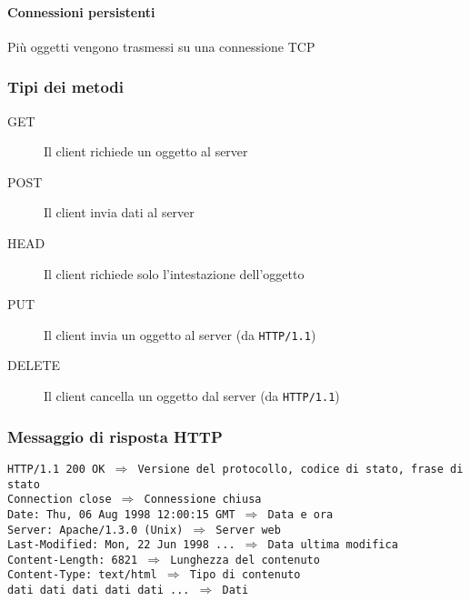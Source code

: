             \paragraph{Connessioni persistenti} Più oggetti vengono trasmessi su una connessione \Acrshort*{TCP}
        \subsubsection{Tipi dei metodi}
            \begin{description}
                \item[GET] Il client richiede un oggetto al server 
                \item[POST] Il client invia dati al server
                \item[HEAD] Il client richiede solo l'intestazione dell'oggetto
                \item[PUT] Il client invia un oggetto al server (da \texttt{\Acrshort*{HTTP}/1.1})
                \item[DELETE] Il client cancella un oggetto dal server (da \texttt{\Acrshort*{HTTP}/1.1})
            \end{description}
        \subsubsection{Messaggio di risposta HTTP}
            \texttt{HTTP/1.1 200 OK $\Rightarrow$ Versione del protocollo, codice di stato, frase di stato\\
                Connection close $\Rightarrow$ Connessione chiusa\\
                Date: Thu, 06 Aug 1998 12:00:15 GMT $\Rightarrow$ Data e ora\\
                Server: Apache/1.3.0 (Unix) $\Rightarrow$ Server web\\
                Last-Modified: Mon, 22 Jun 1998 ... $\Rightarrow$ Data ultima modifica\\
                Content-Length: 6821 $\Rightarrow$ Lunghezza del contenuto\\
                Content-Type: text/html $\Rightarrow$ Tipo di contenuto\\
                dati dati dati dati dati  ... $\Rightarrow$ Dati
            }
